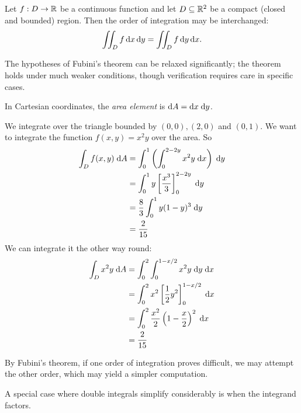 \documentclass[a4paper]{article}
\begin{document}
\begin{thm}
  Let $f: D \to \mathbb{R}$ be a continuous function and let $D \subseteq \mathbb{R}^2$ be a compact (closed and bounded) region. Then the order of integration may be interchanged:
  \[
    \iint_D f \, \mathrm{d} x \, \mathrm{d} y = \iint_D f \, \mathrm{d} y \, \mathrm{d} x.
  \]
\end{thm}

\begin{rmk}
  The hypotheses of Fubini's theorem can be relaxed significantly; the theorem holds under much weaker conditions, though verification requires care in specific cases.
\end{rmk}

\begin{rmk}
  In Cartesian coordinates, the \emph{area element} is $\mathrm{d} A = \mathrm{d} x\;\mathrm{d} y$.
\end{rmk}

\begin{eg}
  We integrate over the triangle bounded by $(0, 0), (2, 0)$ and $(0, 1)$. We want to integrate the function $f(x, y) = x^2y$ over the area. So
  \begin{align*}
    \int _D f(x, y)\;\mathrm{d} A &= \int_0^1 \left(\int_0^{2 - 2y}x^2y \;\mathrm{d} x\right)\; \mathrm{d} y\\
    &= \int_0^1 y\left[\frac{x^3}{3}\right]^{2 - 2y}_0 \;\mathrm{d} y\\
    &= \frac{8}{3}\int_0^1 y(1 - y)^3\;\mathrm{d} y\\
    &= \frac{2}{15}
  \end{align*}
  We can integrate it the other way round:
  \begin{align*}
    \int_D x^2 y\;\mathrm{d} A &= \int_0^2 \int_0^{1 - x/2}x^2y \;\mathrm{d} y\;\mathrm{d} x\\
    &= \int_0^2 x^2\left[\frac{1}{2}y^2\right]_0^{1 - x/2}\;\mathrm{d} x\\
    &= \int_0^2 \frac{x^2}{2} \left(1 - \frac{x}{2}\right)^2 \;\mathrm{d} x\\
    &= \frac{2}{15}
  \end{align*}
\end{eg}

\begin{rmk}
  By Fubini's theorem, if one order of integration proves difficult, we may attempt the other order, which may yield a simpler computation.
\end{rmk}

A special case where double integrals simplify considerably is when the integrand factors.
\end{document}
